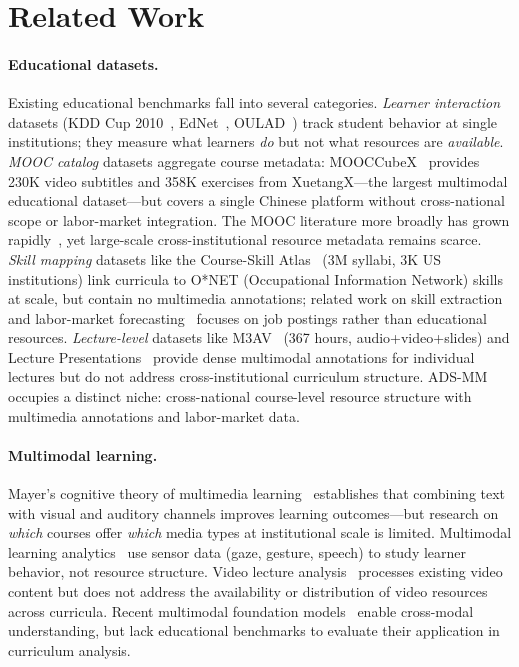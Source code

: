 \documentclass[sigconf,review]{acmart}
\newcommand{\ADSMM}{\textsc{ADS-MM}\xspace}
\begin{document}
\section{Related Work}
\label{sec:related}

\paragraph{Educational datasets.}
Existing educational benchmarks fall into several categories.
\emph{Learner interaction} datasets (KDD Cup 2010~\cite{stamper2010kddcup}, EdNet~\cite{choi2020ednet}, OULAD~\cite{kuzilek2017oulad}) track student behavior at single institutions; they measure what learners \emph{do} but not what resources are \emph{available}.
\emph{MOOC catalog} datasets aggregate course metadata: MOOCCubeX~\cite{yu2023mooccubex} provides 230K video subtitles and 358K exercises from XuetangX---the largest multimodal educational dataset---but covers a single Chinese platform without cross-national scope or labor-market integration. The MOOC literature more broadly has grown rapidly~\cite{zawackirichter2019mooc}, yet large-scale cross-institutional resource metadata remains scarce.
\emph{Skill mapping} datasets like the Course-Skill Atlas~\cite{courseskillatlas2024} (3M syllabi, 3K US institutions) link curricula to O*NET (Occupational Information Network) skills at scale, but contain no multimedia annotations; related work on skill extraction~\cite{zhang2022skillspan,decorte2023skillextraction} and labor-market forecasting~\cite{wef2023futureofwork,shi2020} focuses on job postings rather than educational resources.
\emph{Lecture-level} datasets like M3AV~\cite{m3av2024} (367 hours, audio+video+slides) and Lecture Presentations~\cite{lee2023lecture} provide dense multimodal annotations for individual lectures but do not address cross-institutional curriculum structure.
\ADSMM occupies a distinct niche: cross-national course-level resource structure with multimedia annotations and labor-market data.

\paragraph{Multimodal learning.}
Mayer's cognitive theory of multimedia learning~\cite{mayer2009multimedia,mayer2014multimedia} establishes that combining text with visual and auditory channels improves learning outcomes---but research on \emph{which} courses offer \emph{which} media types at institutional scale is limited.
Multimodal learning analytics~\cite{sharma2020mmla_survey,ifenthaler2020learning} use sensor data (gaze, gesture, speech) to study learner behavior, not resource structure.
Video lecture analysis~\cite{bhat2023lecturevideosurvey} processes existing video content but does not address the availability or distribution of video resources across curricula.
Recent multimodal foundation models~\cite{xu2023mplug2,bommasani2022foundation} enable cross-modal understanding, but lack educational benchmarks to evaluate their application in curriculum analysis.
\end{document}
